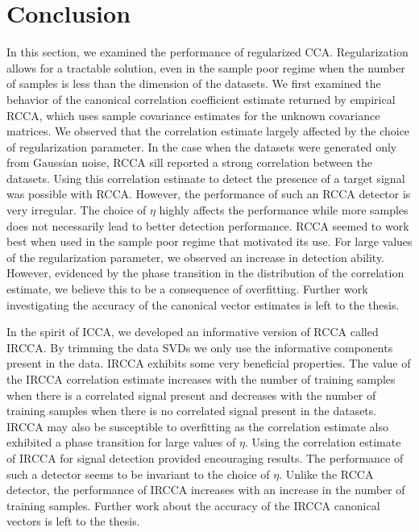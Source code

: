 \section{Conclusion}

In this section, we examined the performance of regularized CCA. Regularization allows for
a tractable solution, even in the sample poor regime when the number of samples is less
than the dimension of the datasets. We first examined the behavior of the canonical
correlation coefficient estimate returned by empirical RCCA, which uses sample covariance
estimates for the unknown covariance matrices. We observed that the correlation estimate
largely affected by the choice of regularization parameter. In the case when the datasets
were generated only from Gaussian noise, RCCA sill reported a strong correlation between
the datasets. Using this correlation estimate to detect the presence of a target signal
was possible with RCCA. However, the performance of such an RCCA detector is very
irregular. The choice of $\eta$ highly affects the performance while more samples does not
necessarily lead to better detection performance. RCCA seemed to work best when used in
the sample poor regime that motivated its use. For large values of the regularization
parameter, we observed an increase in detection ability. However, evidenced by the phase
transition in the distribution of the correlation estimate, we believe this to be a
consequence of overfitting. Further work investigating the accuracy of the canonical vector
estimates is left to the thesis.

In the spirit of ICCA, we developed an informative version of RCCA called IRCCA. By
trimming the data SVDs we only use the informative components present in the data. IRCCA
exhibits some very beneficial properties. The value of the IRCCA correlation estimate
increases with the number of training samples when there is a correlated signal present
and decreases with the number of training samples when there is no correlated signal
present in the datasets. IRCCA may also be susceptible to overfitting as the correlation
estimate also exhibited a phase transition for large values of $\eta$. Using the
correlation estimate of IRCCA for signal detection provided encouraging results. The
performance of such a detector seems to be invariant to the choice of $\eta$. Unlike the
RCCA detector, the performance of IRCCA increases with an increase in the number of
training samples. Further work about the accuracy of the IRCCA canonical vectors is left
to the thesis.
